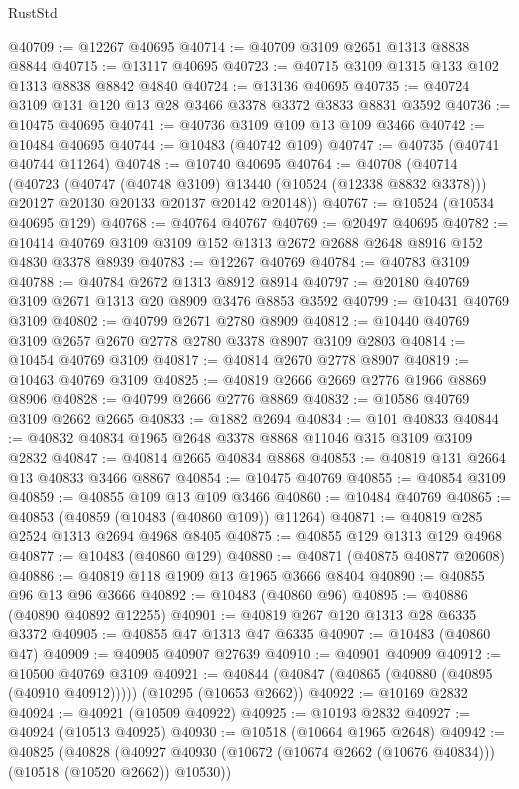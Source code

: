 \begin{lexlean}{RustStd}
\begin{coremodule}
@40709 := @12267 @40695
@40714 := @40709 @3109 @2651 @1313 @8838 @8844
@40715 := @13117 @40695
@40723 := @40715 @3109 @1315 @133 @102 @1313 @8838 @8842 @4840
@40724 := @13136 @40695
@40735 := @40724 @3109 @131 @120 @13 @28 @3466 @3378 @3372 @3833 @8831 @3592
@40736 := @10475 @40695
@40741 := @40736 @3109 @109 @13 @109 @3466
@40742 := @10484 @40695
@40744 := @10483 (@40742 @109)
@40747 := @40735 (@40741 @40744 @11264)
@40748 := @10740 @40695
@40764 := @40708
    (@40714
      (@40723
        (@40747 (@40748 @3109) @13440 (@10524 (@12338 @8832 @3378)))
        @20127
        @20130
        @20133
        @20137
        @20142
        @20148))
@40767 := @10524 (@10534 @40695 @129)
@40768 := @40764 @40767
@40769 := @20497 @40695
@40782 := @10414 @40769 @3109 @3109 @152 @1313 @2672 @2688 @2648 @8916 @152 @4830 @3378 @8939
@40783 := @12267 @40769
@40784 := @40783 @3109
@40788 := @40784 @2672 @1313 @8912 @8914
@40797 := @20180 @40769 @3109 @2671 @1313 @20 @8909 @3476 @8853 @3592
@40799 := @10431 @40769 @3109
@40802 := @40799 @2671 @2780 @8909
@40812 := @10440 @40769 @3109 @2657 @2670 @2778 @2780 @3378 @8907 @3109 @2803
@40814 := @10454 @40769 @3109
@40817 := @40814 @2670 @2778 @8907
@40819 := @10463 @40769 @3109
@40825 := @40819 @2666 @2669 @2776 @1966 @8869 @8906
@40828 := @40799 @2666 @2776 @8869
@40832 := @10586 @40769 @3109 @2662 @2665
@40833 := @1882 @2694
@40834 := @101 @40833
@40844 := @40832 @40834 @1965 @2648 @3378 @8868 @11046 @315 @3109 @3109 @2832
@40847 := @40814 @2665 @40834 @8868
@40853 := @40819 @131 @2664 @13 @40833 @3466 @8867
@40854 := @10475 @40769
@40855 := @40854 @3109
@40859 := @40855 @109 @13 @109 @3466
@40860 := @10484 @40769
@40865 := @40853 (@40859 (@10483 (@40860 @109)) @11264)
@40871 := @40819 @285 @2524 @1313 @2694 @4968 @8405
@40875 := @40855 @129 @1313 @129 @4968
@40877 := @10483 (@40860 @129)
@40880 := @40871 (@40875 @40877 @20608)
@40886 := @40819 @118 @1909 @13 @1965 @3666 @8404
@40890 := @40855 @96 @13 @96 @3666
@40892 := @10483 (@40860 @96)
@40895 := @40886 (@40890 @40892 @12255)
@40901 := @40819 @267 @120 @1313 @28 @6335 @3372
@40905 := @40855 @47 @1313 @47 @6335
@40907 := @10483 (@40860 @47)
@40909 := @40905 @40907 @27639
@40910 := @40901 @40909
@40912 := @10500 @40769 @3109
@40921 := @40844 (@40847 (@40865 (@40880 (@40895 (@40910 @40912))))) (@10295 (@10653 @2662))
@40922 := @10169 @2832
@40924 := @40921 (@10509 @40922)
@40925 := @10193 @2832
@40927 := @40924 (@10513 @40925)
@40930 := @10518 (@10664 @1965 @2648)
@40942 := @40825
    (@40828 (@40927 @40930 (@10672 (@10674 @2662 (@10676 @40834))) (@10518 (@10520 @2662)) @10530))

\end{coremodule}
\end{lexlean}
